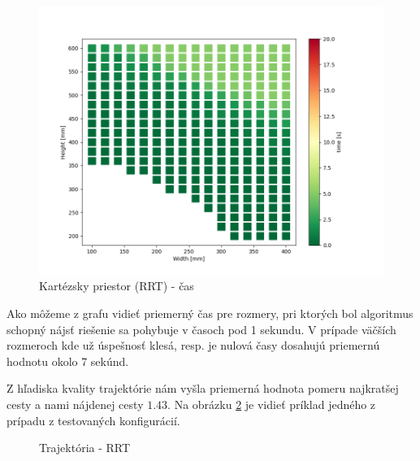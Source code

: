 \begin{figure}[h!]
	\centering
	\includegraphics[width=140mm]{img/XYA-time.png}
	\caption{Kartézsky priestor (RRT) - čas} \label{OBRAZOK 5.1.3} 
\end{figure} 

Ako môžeme z grafu vidieť priemerný čas pre rozmery, pri ktorých bol algoritmus schopný nájsť riešenie sa pohybuje v časoch pod 1 sekundu. V prípade  väčších rozmeroch kde už úspešnosť klesá, resp. je nulová časy dosahujú priemernú hodnotu okolo 7 sekúnd.

Z hľadiska kvality trajektórie nám vyšla priemerná hodnota pomeru najkratšej cesty a nami nájdenej cesty $ 1.43 $. Na obrázku \ref{OBRAZOK 5.1.3.1} je vidieť príklad jedného z prípadu z testovaných konfigurácií. 
\begin{figure}[h!]
	\centering
	\caption{Trajektória - RRT } \label{OBRAZOK 5.1.3.1} 
\end{figure} 

